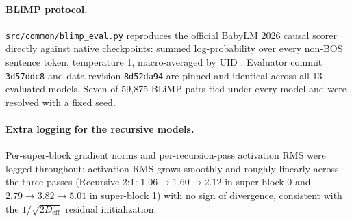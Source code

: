 \documentclass[11pt]{article}
\begin{document}
\paragraph{BLiMP protocol.} \texttt{src/common/blimp\_eval.py} reproduces the official BabyLM 2026 causal scorer directly against native checkpoints: summed log-probability over every non-BOS sentence token, temperature 1, macro-averaged by UID \citep{warstadt2020blimp}. Evaluator commit \texttt{3d57ddc8} and data revision \texttt{8d52da94} are pinned and identical across all 13 evaluated models. Seven of 59{,}875 BLiMP pairs tied under every model and were resolved with a fixed seed.

\paragraph{Extra logging for the recursive models.} Per-super-block gradient norms and per-recursion-pass activation RMS were logged throughout; activation RMS grows smoothly and roughly linearly across the three passes (Recursive 2:1: $1.06 \rightarrow 1.60 \rightarrow 2.12$ in super-block 0 and $2.79 \rightarrow 3.82 \rightarrow 5.01$ in super-block 1) with no sign of divergence, consistent with the $1/\sqrt{2 D_{\text{eff}}}$ residual initialization.
\end{document}
